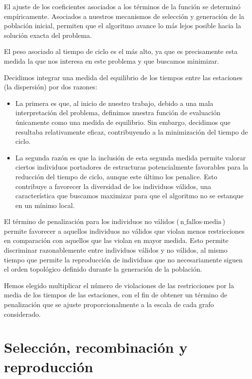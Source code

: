 \documentclass[12pt,a4paper]{report}
\begin{document}
    El ajuste de los coeficientes asociados a los términos de la función se determinó empíricamente. Asociados a nuestros mecanismos de selección y generación de la población inicial, permiten que el algoritmo avance lo más lejos posible hacia la solución exacta del problema.

    El peso asociado al tiempo de ciclo es el más alto, ya que es precisamente esta medida la que nos interesa en este problema y que buscamos minimizar.

    Decidimos integrar una medida del equilibrio de los tiempos entre las estaciones (la dispersión) por dos razones:
    \begin{itemize}
        \item La primera es que, al inicio de nuestro trabajo, debido a una mala interpretación del problema, definimos nuestra función de evaluación únicamente como una medida de equilibrio. Sin embargo, decidimos que resultaba relativamente eficaz, contribuyendo a la minimización del tiempo de ciclo.
        \item La segunda razón es que la inclusión de esta segunda medida permite valorar ciertos individuos portadores de estructuras potencialmente favorables para la reducción del tiempo de ciclo, aunque este último los penalice. Esto contribuye a favorecer la diversidad de los individuos válidos, una característica que buscamos maximizar para que el algoritmo no se estanque en un mínimo local.
    \end{itemize}



    El término de penalización para los individuos no válidos ($\text{n\_fallos} \cdot \text{media}$) permite favorecer a aquellos individuos no válidos que violan menos restricciones en comparación con aquellos que las violan en mayor medida. Esto permite discriminar razonablemente entre individuos válidos y no válidos, al mismo tiempo que permite la reproducción de individuos que no necesariamente siguen el orden topológico definido durante la generación de la población.

    Hemos elegido multiplicar el número de violaciones de las restricciones por la media de los tiempos de las estaciones, con el fin de obtener un término de penalización que se ajuste proporcionalmente a la escala de cada grafo considerado.

    \section{Selección, recombinación y reproducción}
\end{document}
